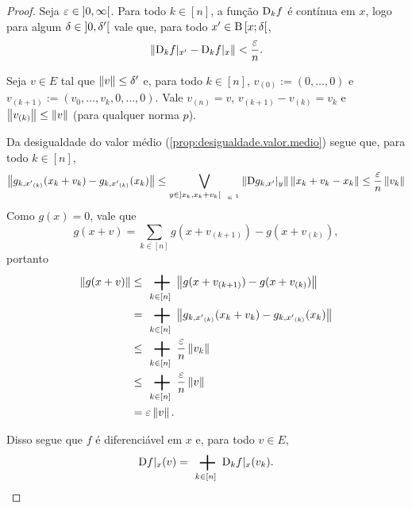 \begin{proof}
Seja $\varepsilon \in \left]{0},{\infty}\right[$. Para todo $k \in [n]$, a função $\mathrm{D}_k f$ é contínua em $x$, logo para algum $\delta \in \left]{0},{\delta'}\right[$ vale que, para todo $x' \in \mathrm{B}\left[{x};{\delta}\right[$,
	\begin{equation*}
	\left\Vert{\mathrm{D}_k f|_{x'} - \mathrm{D}_k f|_x}\right\Vert < \frac{\varepsilon}{n}.
	\end{equation*}

Seja $v \in E$ tal que $\left\Vert{v}\right\Vert \leq \delta'$ e, para todo $k \in [n]$, $v_{(0)} := (0,\ldots,0)$ e $v_{(k+1)} := (v_0,\ldots,v_k,0,\ldots,0)$. Vale $v_{(n)} = v$, $v_{(k+1)} - v_{(k)} = v_k$ e $\left\Vert{v_{(k)}}\right\Vert \leq \left\Vert{v}\right\Vert$ (para qualquer norma $p$).

Da desigualdade do valor médio (\ref{prop:desigualdade.valor.medio}) segue que, para todo $k \in [n]$,
	\begin{equation*}
	\nor{g_{k,{x'}_{(k)}}(x_k+v_k) - g_{k,{x'}_{(k)}}(x_k)} \leq \sup_{y \in \Sxgera{x_k, x_k+v_k}} \nor{\D g_{k,x'}|_{y}} \nor{x_k + v_k - x_k} \leq \frac{\varepsilon}{n} \nor{v_k}
	\end{equation*}
Como $g(x) = 0$, vale que
	\begin{equation*}
	g(x+v) = \sum_{k \in [n]} g(x+v_{(k+1)}) - g(x+v_{(k)}),
	\end{equation*}
portanto
	\begin{align*}
	\nor{g(x+v)} %
		&\leq \sum_{k \in [n]} \nor{g(x+v_{(k+1)}) - g(x+v_{(k)})} \\
		&= \sum_{k \in [n]} \nor{g_{k,{x'}_{(k)}}(x_k+v_k) - g_{k,{x'}_{(k)}}(x_k)} \\
		&\leq \sum_{k \in [n]} \frac{\varepsilon}{n} \nor{v_k} \\
		& \leq \sum_{k \in [n]} \frac{\varepsilon}{n} \nor{v} \\
		&= \varepsilon \nor{v}.
	\end{align*}

Disso segue que $f$ é diferenciável em $x$ e, para todo $v \in E$,
	\begin{equation*}
	\D f|_x(v) = \sum_{k \in [n]} \D_k f|_x(v_k).
	\qedhere
	\end{equation*}
\end{proof}
